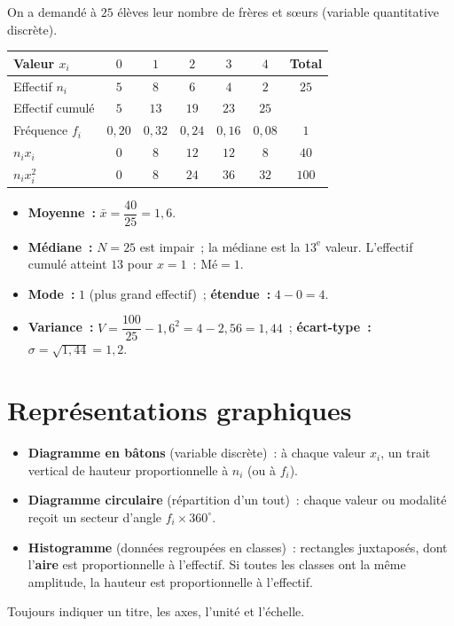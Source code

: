 \begin{ex}
On a demand\'e \`a $25$ \'el\`eves leur nombre de fr\`eres et s\oe urs
(variable quantitative discr\`ete).

\medskip\centering
\renewcommand{\arraystretch}{1.3}
\begin{tabular}{|l|c|c|c|c|c|c|}
\hline
\rowcolor{BN!10}
Valeur $x_i$ & $0$ & $1$ & $2$ & $3$ & $4$ & Total \\
\hline
Effectif $n_i$ & $5$ & $8$ & $6$ & $4$ & $2$ & $25$ \\
Effectif cumul\'e & $5$ & $13$ & $19$ & $23$ & $25$ & \\
Fr\'equence $f_i$ & $0{,}20$ & $0{,}32$ & $0{,}24$ & $0{,}16$ & $0{,}08$ & $1$ \\
$n_ix_i$ & $0$ & $8$ & $12$ & $12$ & $8$ & $40$ \\
$n_ix_i^2$ & $0$ & $8$ & $24$ & $36$ & $32$ & $100$ \\
\hline
\end{tabular}

\medskip\flushleft
\begin{itemize}
  \item \textbf{Moyenne~:} $\bar x=\dfrac{40}{25}=1{,}6$.
  \item \textbf{M\'ediane~:} $N=25$ est impair~; la m\'ediane est la $13^{\text{e}}$
        valeur. L'effectif cumul\'e atteint $13$ pour $x=1$~: $\text{M\'e}=1$.
  \item \textbf{Mode~:} $1$ (plus grand effectif)~; \textbf{\'etendue~:} $4-0=4$.
  \item \textbf{Variance~:} $V=\dfrac{100}{25}-1{,}6^2=4-2{,}56=1{,}44$~;
        \textbf{\'ecart-type~:} $\sigma=\sqrt{1{,}44}=1{,}2$.
\end{itemize}
\end{ex}

\section{Repr\'esentations graphiques}

\begin{methode}
\begin{itemize}
  \item \textbf{Diagramme en b\^atons} (variable discr\`ete)~: \`a chaque valeur
        $x_i$, un trait vertical de hauteur proportionnelle \`a $n_i$ (ou \`a $f_i$).
  \item \textbf{Diagramme circulaire} (r\'epartition d'un tout)~: chaque valeur
        ou modalit\'e re\c{c}oit un secteur d'angle $f_i\times360^{\circ}$.
  \item \textbf{Histogramme} (donn\'ees regroup\'ees en classes)~: rectangles
        juxtapos\'es, dont l'\textbf{aire} est proportionnelle \`a l'effectif.
        Si toutes les classes ont la m\^eme amplitude, la hauteur est
        proportionnelle \`a l'effectif.
\end{itemize}
Toujours indiquer un titre, les axes, l'unit\'e et l'\'echelle.
\end{methode}

